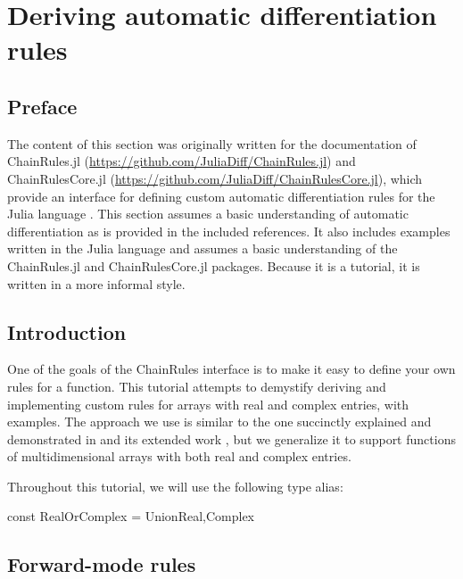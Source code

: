 \documentclass[../../main.tex]{subfiles}
\begin{document}
\chapter{Deriving automatic differentiation rules}\label{ad-rules}

\begin{refsection}

\section{Preface}\label{preface}

The content of this section was originally written for the documentation of ChainRules.jl (\url{https://github.com/JuliaDiff/ChainRules.jl}) and ChainRulesCore.jl (\url{https://github.com/JuliaDiff/ChainRulesCore.jl}), which provide an interface for defining custom automatic differentiation rules for the Julia language \supercite{Julia-2017}.
This section assumes a basic understanding of automatic differentiation as is provided in the included references.
It also includes examples written in the Julia language and assumes a basic understanding of the ChainRules.jl and ChainRulesCore.jl packages.
Because it is a tutorial, it is written in a more informal style.

\clearpage %
\section{Introduction}\label{introduction}

One of the goals of the ChainRules interface is to make it easy to define your own rules for a function.
This tutorial attempts to demystify deriving and implementing custom rules for arrays with real and complex entries, with examples.
The approach we use is similar to the one succinctly explained and demonstrated in \cite{gilesCollectedMatrixDerivative2008} and its extended work \cite{gilesExtendedCollectionMatrix2008}, but we generalize it to support functions of multidimensional arrays with both real and complex entries.

Throughout this tutorial, we will use the following type alias:
\begin{juliacode}
const RealOrComplex = Union{Real,Complex}
\end{juliacode}
\section{Forward-mode rules}\label{forward-mode-rules}


\end{refsection}
\end{document}
